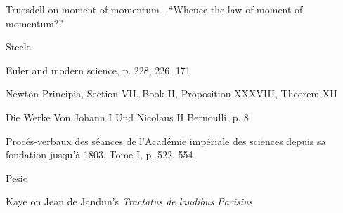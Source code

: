 \documentclass{article}
\begin{document}
Truesdell on moment of momentum \cite[pp.~239--271]{truesdell1968V}, ``Whence the law of moment of momentum?''

Steele \cite[p.~349]{steele}

Euler and modern science, p. 228, 226, 171

Newton Principia, Section VII, Book II, Proposition XXXVIII, Theorem XII

Die Werke Von Johann I Und Nicolaus II Bernoulli, p. 8

Proc\'es-verbaux des s\'eances de l'Acad\'emie imp\'eriale des sciences depuis sa fondation jusqu'\`a 1803, Tome I, p. 522, 554

Pesic \cite[p.~22]{pesic2014}

Kaye \cite[p.~287]{kaye} on Jean de Jandun's {\em Tractatus de laudibus Parisius}

\nocite{*}



\end{document}
